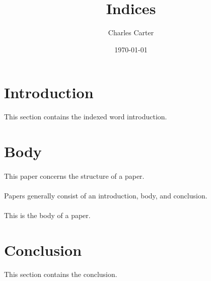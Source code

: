 \documentclass{article}
\title{Indices}
\author{Charles Carter}
\date{\today{}}
\begin{document}
 
    \maketitle{}
    \tableofcontents{}
    \section{Introduction}
    \label{inTroduction}
    This section contains the indexed word introduction.
    \section{Body}
    \label{Body}
    \paragraph{}This paper concerns the structure of a paper.
    \paragraph{}Papers generally consist of an introduction, body, and conclusion.
    \paragraph{}This is the body of a paper.
    \section{Conclusion}
    This section contains the conclusion.
    \label{Conclusion}
    \printindex{}
\end{document}
